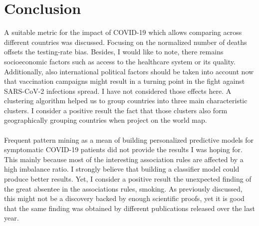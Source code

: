 \documentclass[11pt,a4paper]{article}
\begin{document}
\section{Conclusion}
A suitable metric for the impact of COVID-19 which allows comparing across
different countries was discussed. Focusing on the normalized number of deaths
offsets the testing-rate bias. Besides, I would like to note, there remains
socioeconomic factors such as access to the healthcare system or its quality.
Additionally, also international political factors should be taken into account
now that vaccination campaigns might result in a turning point in the fight
against SARS-CoV-2 infections spread. I have not considered those effects here.
A clustering algorithm helped us to group countries into three main
characteristic clusters. I consider a positive result the fact that those
clusters also form geographically grouping countries when project on the world
map.\\
\\
Frequent pattern mining as a mean of building personalized predictive models for
symptomatic COVID-19 patients did not provide the results I was hoping for.
This mainly because most of the interesting association rules are affected by
a high imbalance ratio. I strongly believe that building a classifier model
could produce better results. Yet, I consider a positive result the unexpected
finding of the great absentee in the associations rules, smoking. As previously
discussed, this might not be a discovery backed by enough scientific proofs, yet
it is good that the same finding was obtained by different publications released
over the last year.
\newpage
\end{document}
